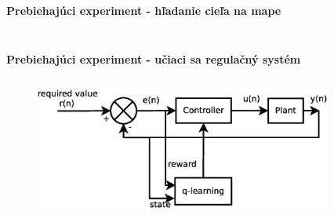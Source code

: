\documentclass[xcolor=dvipsnames]{beamer}
\begin{document}
\begin{frame}[fragile]{\bf Prebiehajúci experiment - hľadanie cieľa na mape}
\begin{columns}
\begin{column}{0.8\textwidth}
\begin{figure}[ht]
            \end{figure}

    	\end{column}
    \end{columns}

\end{frame}


\begin{frame}[fragile]{\bf Prebiehajúci experiment - učiaci sa regulačný systém}

    \begin{columns}
    	\begin{column}{0.5\textwidth}

            \begin{figure}[ht]

            \begin{center}
            \includegraphics[width=1.0\textwidth]{diagrams/controller.eps}
            \end{center}

            \end{figure}

    	\end{column}
    	\begin{column}{0.5\textwidth}

            \begin{figure}[ht]


\end{figure}
\end{column}
\end{columns}
\end{frame}
\end{document}
